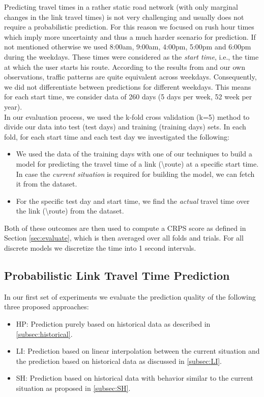 Predicting travel times in a rather static road network (with only marginal changes in the link travel times) is not very challenging and usually does not require a probabilistic prediction. For this reason we focused on rush hour times which imply more uncertainty and thus a much harder scenario for prediction. If not mentioned otherwise we used 8:00am, 9:00am, 4:00pm, 5:00pm and 6:00pm during the weekdays. These times were considered as the \textit{start time}, i.e., the time at which the user starts his route. According to the results from \cite{Pan12} and our own observations, traffic patterns are quite equivalent across weekdays. Consequently, we did not differentiate between predictions for different weekdays. This means for each start time, we consider data of 260 days (5 days per week, 52 week per year). \\
In our evaluation process, we used the k-fold cross validation (k=5) method to divide our data into test (test days) and training (training days) sets. In each fold, for each start time and each test day we investigated the following:
\begin{itemize}
  \item We used the data of the training days with one of our techniques to build a model for predicting the travel time of a link (\textbackslash route) at a specific start time. In case the \textit{current situation} is required for building the model, we can fetch it from the dataset.
  \item For the specific test day and start time, we find the \textit{actual} travel time over the link (\textbackslash route) from the dataset.
\end{itemize}

Both of these outcomes are then used to compute a CRPS score as defined in Section \ref{sec:evaluate}, which is then averaged over all folds and trials. For all discrete models we discretize the time into 1 second intervals.

\subsection{Probabilistic Link Travel Time Prediction}
\label{subsec:pltt_prediction}
In our first set of experiments we evaluate the prediction quality of the following three proposed approaches:
\begin{itemize}
  \item HP: Prediction purely based on historical data as described in \cref{subsec:historical}.
  \item LI: Prediction based on linear interpolation between the current situation and the prediction based on historical data as discussed in \cref{subsec:LI}.
  \item SH: Prediction based on historical data with behavior similar to the current situation as proposed in \cref{subsec:SH}.
\end{itemize}


